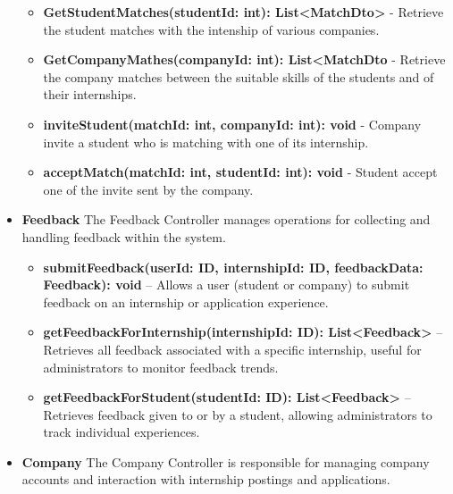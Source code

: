 \begin{itemize}
\begin{itemize}
    \item \textbf{GetStudentMatches(studentId: int): List<MatchDto>} - Retrieve the student matches with the intenship of various companies.
    \item \textbf{GetCompanyMathes(companyId: int): List<MatchDto} - Retrieve the company matches between the suitable skills of the students and of their internships.
    \item \textbf{inviteStudent(matchId: int, companyId: int): void} - Company invite a student who is matching with one of its internship.
    \item \textbf{acceptMatch(matchId: int, studentId: int): void} - Student accept one of the invite sent by the company.

\end{itemize}


\item \textbf{Feedback}
The Feedback Controller manages operations for collecting and handling feedback within the system.

\begin{itemize}
    \item \textbf{submitFeedback(userId: ID, internshipId: ID, feedbackData: Feedback): void} – Allows a user (student or company) to submit feedback on an internship or application experience.
    \item \textbf{getFeedbackForInternship(internshipId: ID): List<Feedback>} – Retrieves all feedback associated with a specific internship, useful for administrators to monitor feedback trends.
    \item \textbf{getFeedbackForStudent(studentId: ID): List<Feedback>} – Retrieves feedback given to or by a student, allowing administrators to track individual experiences.
\end{itemize}

\item \textbf{Company}
The Company Controller is responsible for managing company accounts and interaction with internship postings and applications.


\end{itemize}
